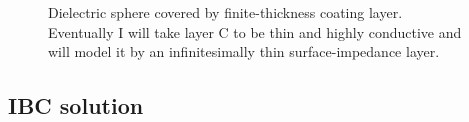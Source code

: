 \documentclass{article}
\begin{document}
\begin{figure}[h]
\caption{Dielectric sphere covered by finite-thickness coating layer.
Eventually I will take layer C to be thin and highly conductive
and will model it by an infinitesimally thin surface-impedance layer.}
\label{CoatedSphereFigure}
\end{figure}

\subsection{IBC solution}
\end{document}

